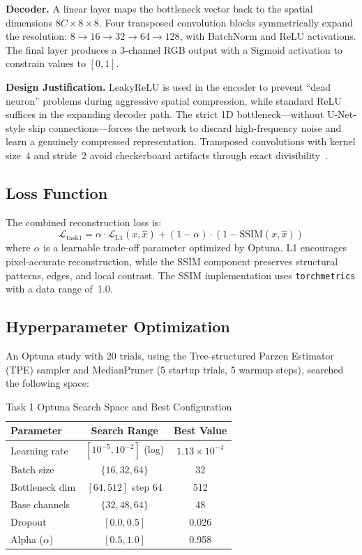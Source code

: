 \documentclass[conference]{IEEEtran}
\begin{document}
\textbf{Decoder.} A linear layer maps the bottleneck vector back to the spatial dimensions $8C \times 8 \times 8$. Four transposed convolution blocks symmetrically expand the resolution: $8 \rightarrow 16 \rightarrow 32 \rightarrow 64 \rightarrow 128$, with BatchNorm and ReLU activations. The final layer produces a 3-channel RGB output with a Sigmoid activation to constrain values to $[0, 1]$.

\textbf{Design Justification.} LeakyReLU is used in the encoder to prevent ``dead neuron'' problems during aggressive spatial compression, while standard ReLU suffices in the expanding decoder path. The strict 1D bottleneck---without U-Net-style skip connections---forces the network to discard high-frequency noise and learn a genuinely compressed representation. Transposed convolutions with kernel size~4 and stride~2 avoid checkerboard artifacts through exact divisibility~\cite{odena2016deconvolution}.

\subsection{Loss Function}

The combined reconstruction loss is:
\begin{equation}
\mathcal{L}_{\text{task1}} = \alpha \cdot \mathcal{L}_{\text{L1}}(x, \hat{x}) + (1 - \alpha) \cdot (1 - \text{SSIM}(x, \hat{x}))
\label{eq:task1_loss}
\end{equation}
where $\alpha$ is a learnable trade-off parameter optimized by Optuna. L1 encourages pixel-accurate reconstruction, while the SSIM component preserves structural patterns, edges, and local contrast. The SSIM implementation uses \texttt{torchmetrics} with a data range of~1.0.

\subsection{Hyperparameter Optimization}

An Optuna study with 20 trials, using the Tree-structured Parzen Estimator (TPE) sampler and MedianPruner (5 startup trials, 5 warmup steps), searched the following space:

\begin{table}[H]
\centering
\caption{Task 1 Optuna Search Space and Best Configuration}
\label{tab:task1_hpo}
\begin{tabular}{lcc}
\toprule
\textbf{Parameter} & \textbf{Search Range} & \textbf{Best Value} \\
\midrule
Learning rate & $[10^{-5}, 10^{-2}]$ (log) & $1.13 \times 10^{-4}$ \\
Batch size & $\{16, 32, 64\}$ & 32 \\
Bottleneck dim & $[64, 512]$ step 64 & 512 \\
Base channels & $\{32, 48, 64\}$ & 48 \\
Dropout & $[0.0, 0.5]$ & 0.026 \\
Alpha ($\alpha$) & $[0.5, 1.0]$ & 0.958 \\
\bottomrule
\end{tabular}
\end{table}
\end{document}
